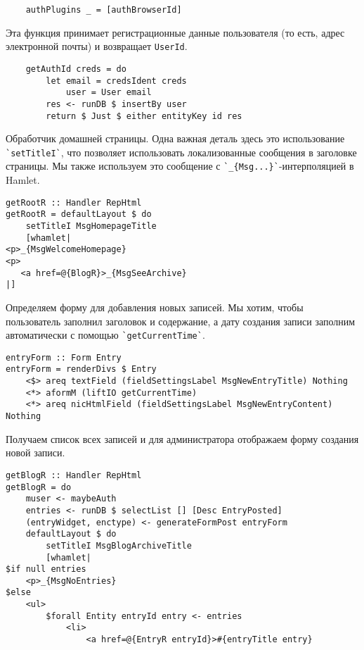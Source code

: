 \begin{lstlisting}
    authPlugins _ = [authBrowserId]
\end{lstlisting}
 
Эта функция принимает регистрационные данные пользователя (то есть, адрес электронной почты) и возвращает \lstinline!UserId!. 
 
\begin{lstlisting}
    getAuthId creds = do
        let email = credsIdent creds
            user = User email
        res <- runDB $ insertBy user
        return $ Just $ either entityKey id res
\end{lstlisting}%
 
Обработчик домашней страницы. Одна важная деталь здесь это использование \lstinline'`setTitleI`', что позволяет использовать локализованные сообщения в заголовке страницы. Мы также используем это сообщение с \lstinline'`_{Msg...}`'-интерполяцией в Hamlet. 
 
\begin{lstlisting}
getRootR :: Handler RepHtml
getRootR = defaultLayout $ do
    setTitleI MsgHomepageTitle
    [whamlet|
<p>_{MsgWelcomeHomepage}
<p>
   <a href=@{BlogR}>_{MsgSeeArchive}
|]
\end{lstlisting}%
 
Определяем форму для добавления новых записей. Мы хотим, чтобы пользователь заполнил заголовок и содержание, а дату создания записи заполним автоматически с помощью \lstinline'`getCurrentTime`'. 
 
\begin{lstlisting}
entryForm :: Form Entry
entryForm = renderDivs $ Entry
    <$> areq textField (fieldSettingsLabel MsgNewEntryTitle) Nothing
    <*> aformM (liftIO getCurrentTime)
    <*> areq nicHtmlField (fieldSettingsLabel MsgNewEntryContent) Nothing
\end{lstlisting}
 
Получаем список всех записей и для администратора отображаем форму создания новой записи. 
 
\begin{lstlisting}
getBlogR :: Handler RepHtml
getBlogR = do
    muser <- maybeAuth
    entries <- runDB $ selectList [] [Desc EntryPosted]
    (entryWidget, enctype) <- generateFormPost entryForm
    defaultLayout $ do
        setTitleI MsgBlogArchiveTitle
        [whamlet|
$if null entries
    <p>_{MsgNoEntries}
$else
    <ul>
        $forall Entity entryId entry <- entries
            <li>
                <a href=@{EntryR entryId}>#{entryTitle entry}
\end{lstlisting}%
 
